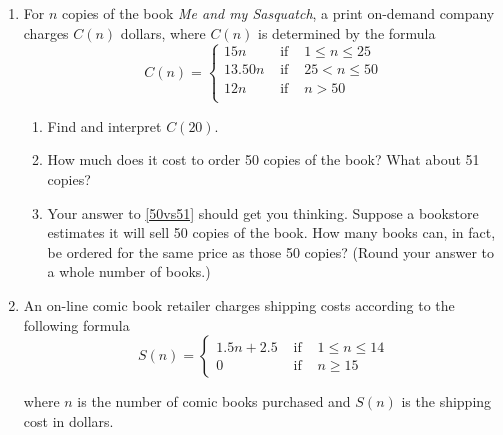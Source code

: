 \documentclass{ximera}
\begin{document}
\begin{enumerate}

\setcounter{enumi}{\value{HW}}



\item \label{piecewiseordering} For $n$ copies of the book \textit{Me and my Sasquatch}, a print on-demand company charges $C(n)$ dollars, where $C(n)$ is determined by the formula \[{\displaystyle C(n) = \left\{ \begin{array}{rcl}  15n & \mbox{ if } & 1 \leq n \leq 25  \\
                                                            13.50n  & \mbox{ if } & 25 < n \leq 50 \\
                                                            12n & \mbox{ if } & n > 50 \\
                                     \end{array} \right. }\]


\begin{enumerate}

\item  Find and interpret $C(20)$.

\item  \label{50vs51} How much does it cost to order 50 copies of the book?  What about 51 copies?

\item  Your answer to \ref{50vs51} should get you thinking. Suppose a bookstore estimates it will sell 50 copies of the book.  How many books can, in fact, be ordered for the same price as those 50 copies? (Round your answer to a  whole number of books.)

\end{enumerate}

\item \label{piecewiseshipping} An on-line comic book retailer charges shipping costs according to the following formula \[{\displaystyle S(n) = \left\{ \begin{array}{rcl}  1.5 n + 2.5 & \mbox{ if } & 1 \leq n \leq 14  \\
                                                            0  & \mbox{ if } & n \geq 15
                                     \end{array} \right. }\]

where $n$ is the number of  comic books purchased and $S(n)$ is the shipping cost in dollars.

\begin{enumerate}


\end{enumerate}
\end{enumerate}
\end{document}
